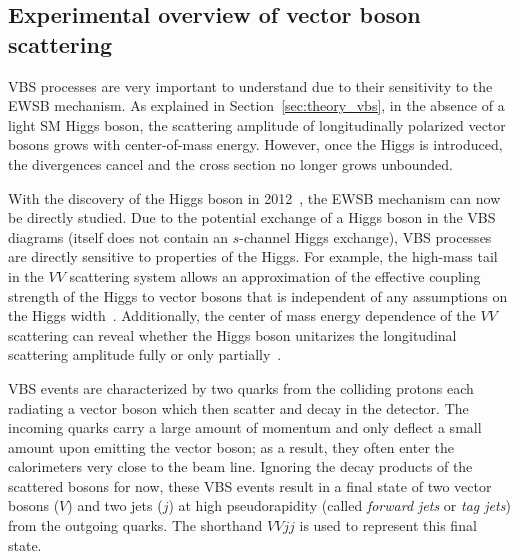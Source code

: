 \subsection{Experimental overview of vector boson scattering}\label{ssww13tev:vbs_theory}
VBS processes are very important to understand due to their sensitivity to the EWSB mechanism.
As explained in Section~\ref{sec:theory_vbs}, in the absence of a light SM Higgs boson, the scattering amplitude of longitudinally polarized vector bosons grows with center-of-mass energy. %
However, once the Higgs is introduced, the divergences cancel and the cross section no longer grows unbounded. %

With the discovery of the Higgs boson in 2012~\cite{HIGG-2012-27, CMS-HIG-12-028}, the EWSB mechanism can now be directly studied.
Due to the potential exchange of a Higgs boson in the VBS diagrams (\ssww itself does not contain an $s$-channel Higgs exchange), VBS processes are directly sensitive to properties of the Higgs.
For example, the high-mass tail in the $VV$ scattering system allows an approximation of the effective coupling strength of the Higgs to vector bosons that is independent of any assumptions on the Higgs width~\cite{2015.higgs-constraints-from-vbs}.
Additionally, the center of mass energy dependence of the $VV$ scattering can reveal whether the Higgs boson unitarizes the longitudinal scattering amplitude fully or only partially~\cite{2014.higgs-WW-scattering-theory}.

VBS events are characterized by two quarks from the colliding protons each radiating a vector boson which then scatter and decay in the detector.
The incoming quarks carry a large amount of momentum and only deflect a small amount upon emitting the vector boson; as a result, they often enter the calorimeters very close to the beam line.
Ignoring the decay products of the scattered bosons for now, these VBS events result in a final state of two vector bosons ($V$) and two jets ($j$) at high pseudorapidity (called \emph{forward jets} or \emph{tag jets}) from the outgoing quarks.
The shorthand $VVjj$ is used to represent this final state.

